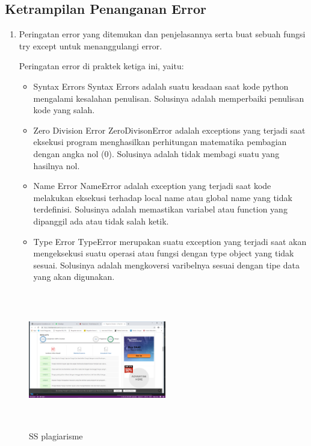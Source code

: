 \subsection{Ketrampilan Penanganan Error}
\begin{enumerate}
	\item Peringatan error yang ditemukan dan penjelasannya serta buat sebuah fungsi try except untuk menanggulangi error.
	
	Peringatan error di praktek ketiga ini, yaitu:
	\begin{itemize}
		\item Syntax Errors
		Syntax Errors adalah suatu keadaan saat kode python mengalami kesalahan penulisan. Solusinya adalah memperbaiki penulisan kode yang salah.
		
		\item Zero Division Error
		ZeroDivisonError adalah exceptions yang terjadi saat eksekusi program menghasilkan perhitungan matematika pembagian dengan angka nol (0). Solusinya adalah tidak membagi suatu yang hasilnya nol.
		
		\item Name Error
		NameError adalah exception yang terjadi saat kode melakukan eksekusi terhadap local name atau global name yang tidak terdefinisi. Solusinya adalah memastikan variabel atau function yang dipanggil ada atau tidak salah ketik.
		
		\item Type Error
		TypeError merupakan suatu exception yang terjadi saat akan mengeksekusi suatu operasi atau fungsi dengan type object yang tidak sesuai. Solusinya adalah mengkoversi varibelnya sesuai dengan tipe data yang akan digunakan.
	\end{itemize}
   \end{enumerate}

   \begin{figure}
   \centering
   \includegraphics[width=6cm,height=6cm]{figures/damaraa.png}
   \caption{SS plagiarisme}
   \label{damara}
   \end{figure}

